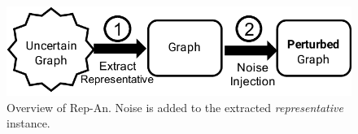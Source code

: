 \begin{figure}[t]
	\vspace{-1em}
    \captionsetup{margin=0cm}
    \centering  
        \includegraphics[width=0.95\columnwidth]{AddFigure/repOB.pdf}
        \vspace{-0.7em}
    	\caption{Overview of Rep-An. Noise is added to the extracted \emph{representative} instance.}
    \label{fig:repOB}
    \vspace{-0.5em}
\end{figure}
